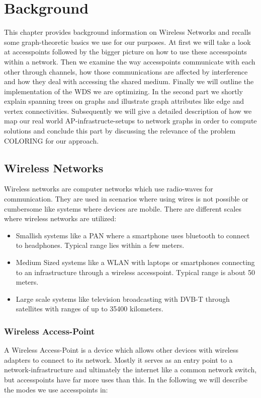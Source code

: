 \chapter{Background}
This chapter provides background information on Wireless Networks and recalls some graph-theoretic basics we use for our purposes.
At first we will take a look at accesspoints followed by the bigger picture on how to use these accesspoints
within a network. Then we examine the way accesspoints communicate with each other through channels, how those communications are affected by interference and
how they deal with accessing the shared medium. Finally we will outline the implementation of the \ac{WDS} we are optimizing.
In the second part we shortly explain spanning trees on graphs and illustrate graph attributes like edge and vertex connectivities.
Subsequently we will give a detailed description of how we map our real world \ac{AP}-infrastructe-setups to network graphs in order to compute solutions and conclude this part by
discussing the relevance of the problem COLORING for our approach.

\section{Wireless Networks}
  Wireless networks are computer networks which use radio-waves for communication.
  They are used in scenarios where using wires is not possible or cumbersome like systems where devices are mobile.
  There are different scales where wireless networks are utilized:
  \begin{itemize}
    \item Smallish systems like a \ac{PAN} where a smartphone uses bluetooth to connect to headphones. Typical range lies within a few meters.
    \item Medium Sized systems like a \ac{WLAN} with laptops or smartphones connecting to an infrastructure through a wireless accesspoint.
      Typical range is about 50 meters.
    \item Large scale systems like television broadcasting with \ac{DVB-T} through satellites with ranges of up to 35400 kilometers.
  \end{itemize}

  \subsection{Wireless Access-Point}
    A Wireless Access-Point is a device which allows other devices with wireless adapters to connect to its network.
    Mostly it serves as an entry point to a network-infrastructure and ultimately the internet like a common network switch, 
    but accesspoints have far more uses than this. In the following we will describe the modes we use accesspoints in:
    
